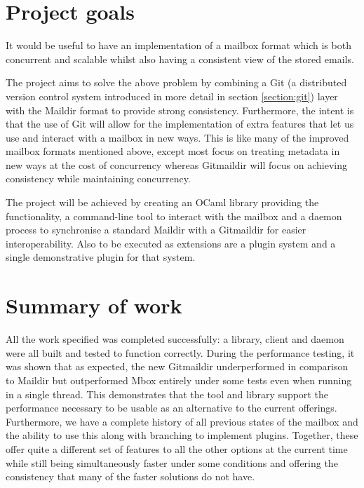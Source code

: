 \section{Project goals}

It would be useful to have an implementation of a mailbox format which is both concurrent and scalable whilst also having a consistent view of the stored emails.

The project aims to solve the above problem by combining a Git (a distributed version control system introduced in more detail in section \ref{section:git}) layer with the Maildir format to provide strong consistency. Furthermore, the intent is that the use of Git will allow for the implementation of extra features that let us use and interact with a mailbox in new ways. This is like many of the improved mailbox formats mentioned above, except most focus on treating metadata in new ways at the cost of concurrency whereas Gitmaildir will focus on achieving consistency while maintaining concurrency.

The project will be achieved by creating an OCaml library providing the functionality, a command-line tool to interact with the mailbox and a daemon process to synchronise a standard Maildir with a Gitmaildir for easier interoperability. Also to be executed as extensions are a plugin system and a single demonstrative plugin for that system.

\section{Summary of work}

All the work specified was completed successfully: a library, client and daemon were all built and tested to function correctly. During the performance testing, it was shown that as expected, the new Gitmaildir underperformed in comparison to Maildir but outperformed Mbox entirely under some tests even when running in a single thread. This demonstrates that the tool and library support the performance necessary to be usable as an alternative to the current offerings. Furthermore, we have a complete history of all previous states of the mailbox and the ability to use this along with branching to implement plugins. Together, these offer quite a different set of features to all the other options at the current time while still being simultaneously faster under some conditions and offering the consistency that many of the faster solutions do not have.

